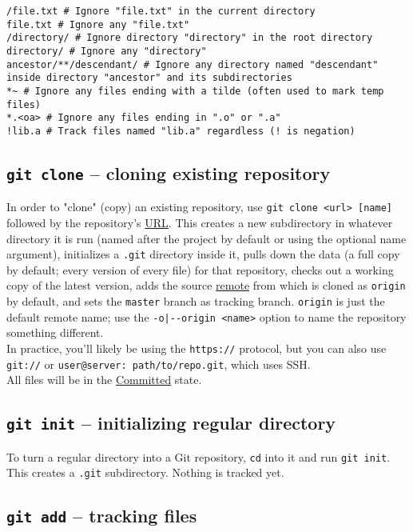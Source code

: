 \documentclass[8pt, table, xcdraw]{article}%
\begin{document}
\begin{lstlisting}
/file.txt # Ignore "file.txt" in the current directory
file.txt # Ignore any "file.txt"
/directory/ # Ignore directory "directory" in the root directory
directory/ # Ignore any "directory"
ancestor/**/descendant/ # Ignore any directory named "descendant" inside directory "ancestor" and its subdirectories
*~ # Ignore any files ending with a tilde (often used to mark temp files)
*.<oa> # Ignore any files ending in ".o" or ".a"
!lib.a # Track files named "lib.a" regardless (! is negation)
\end{lstlisting}

\subsection{\lstinline{git clone} -- cloning existing repository}

In order to "clone" (copy) an existing repository, use \lstinline{git clone <url> [name]} followed by the repository's \hyperref[protocols]{URL}. This creates a new subdirectory in whatever directory it is run (named after the project by default or using the optional name argument), initializes a \lstinline{.git} directory inside it, pulls down the data (a full copy by default; every version of every file) for that repository, checks out a working copy of the latest version, adds the source \hyperref[remote]{remote} from which is cloned as \lstinline{origin} by default, and sets the \lstinline{master} branch as tracking branch. \lstinline{origin} is just the default remote name; use the \lstinline{-o|--origin <name>} option to name the repository something different. \\
In practice, you'll likely be using the \lstinline{https://} protocol, but you can also use \lstinline{git://} or \lstinline{user@server: path/to/repo.git}, which uses SSH.\\
All files will be in the  \hyperref[states]{Committed} state.

\subsection{\lstinline{git init} -- initializing regular directory} \label{init}

To turn a regular directory into a Git repository, \lstinline{cd} into it and run \lstinline{git init}. This creates a \lstinline{.git} subdirectory. Nothing is tracked yet.

\subsection{\lstinline{git add} -- tracking files} \label{add}
\end{document}
